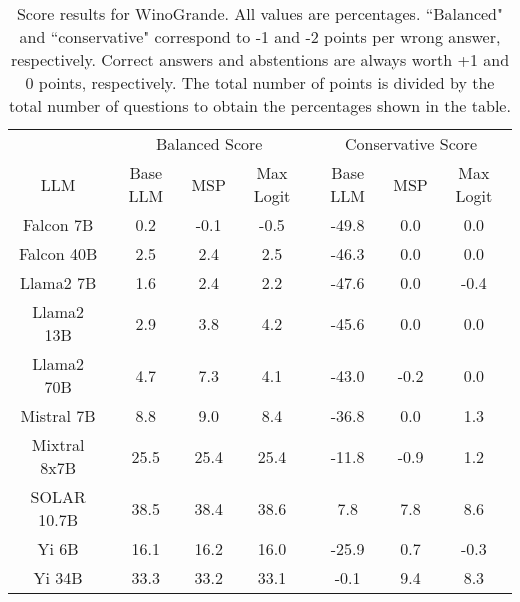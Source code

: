 \begin{table*}
\centering
\begin{tabular}{c|c|c|c|c|c|c}
& \multicolumn{3}{c|}{Balanced Score} & \multicolumn{3}{c}{Conservative Score} \\ 
LLM & Base LLM & MSP & Max Logit & Base LLM & MSP & Max Logit\\ \hline
Falcon 7B & 0.2 & -0.1 & -0.5 & -49.8 & 0.0 & 0.0\\
Falcon 40B & 2.5 & 2.4 & 2.5 & -46.3 & 0.0 & 0.0\\
Llama2 7B & 1.6 & 2.4 & 2.2 & -47.6 & 0.0 & -0.4\\
Llama2 13B & 2.9 & 3.8 & 4.2 & -45.6 & 0.0 & 0.0\\
Llama2 70B & 4.7 & 7.3 & 4.1 & -43.0 & -0.2 & 0.0\\
Mistral 7B & 8.8 & 9.0 & 8.4 & -36.8 & 0.0 & 1.3\\
Mixtral 8x7B & 25.5 & 25.4 & 25.4 & -11.8 & -0.9 & 1.2\\
SOLAR 10.7B & 38.5 & 38.4 & 38.6 & 7.8 & 7.8 & 8.6\\
Yi 6B & 16.1 & 16.2 & 16.0 & -25.9 & 0.7 & -0.3\\
Yi 34B & 33.3 & 33.2 & 33.1 & -0.1 & 9.4 & 8.3\\
\hline
\end{tabular}
\caption{Score results for WinoGrande. All values are percentages. ``Balanced" and ``conservative" correspond to -1 and -2 points per wrong answer, respectively. Correct answers and abstentions are always worth +1 and 0 points, respectively. The total number of points is divided by the total number of questions to obtain the percentages shown in the table.}
\label{tab:winogrande_score}
\end{table*}
